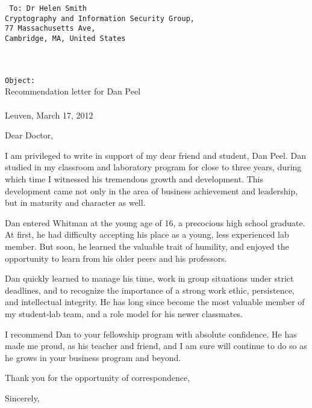\documentclass[a4paper,11pt]{article}
\begin{document}
\begin{multicols}{2}
\hfill\vfill
\columnbreak
{\tt
To: Dr Helen Smith\\
Cryptography and Information Security Group,\\
77 Massachusetts Ave,\\
Cambridge, MA, United States
\\\\\\
}
\end{multicols}

\begin{multicols}{2}
{\tt Object:}\\ 
Recommendation letter for Dan Peel
\\\\
Leuven, March 17, 2012
\end{multicols}

Dear Doctor, 

I am privileged to write in support of my dear friend and student, Dan Peel. Dan studied in my classroom and
laboratory program for close to three years, during which time I witnessed his tremendous growth and development. This
development came not only in the area of business achievement and leadership, but in maturity and character as well.

Dan entered Whitman at the young age of 16, a precocious high school graduate. At first, he had difficulty accepting his
place as a young, less experienced lab member. But soon, he learned the valuable trait of humility, and enjoyed the
opportunity to learn from his older peers and his professors.

Dan quickly learned to manage his time, work in group situations under strict deadlines, and to recognize the importance
of a strong work ethic, persistence, and intellectual integrity. He has long since become the most valuable member of
my student-lab team, and a role model for his newer classmates.

I recommend Dan to your fellowship program with absolute confidence. He has made me proud, as his teacher and friend,
and I am sure will continue to do so as he grows in your business program and beyond.

Thank you for the opportunity of correspondence,

Sincerely,
\end{document}
